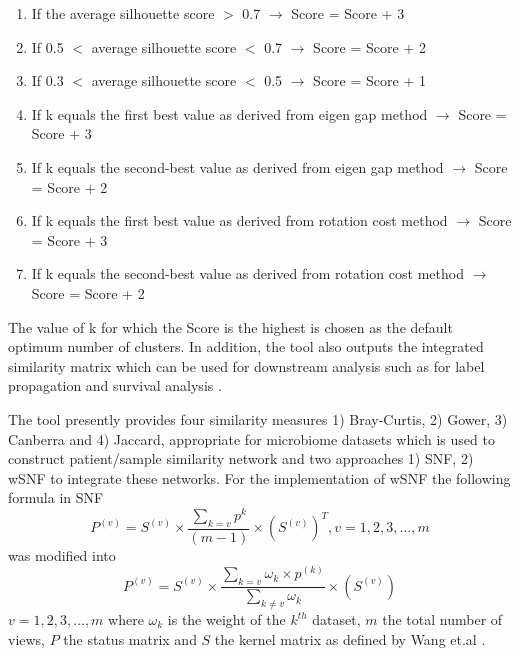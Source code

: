 \begin{enumerate}
	\item If the average silhouette score $>$ 0.7 $\rightarrow$ Score = Score + 3
	\item If 0.5 $<$ average silhouette score $<$ 0.7 $\rightarrow$ Score = Score + 2
	\item If 0.3 $<$ average silhouette score $<$ 0.5 $\rightarrow$ Score = Score + 1
	\item If k equals the first best value as derived from eigen gap method $\rightarrow$ Score = Score + 3
	\item If k equals the second-best value as derived from eigen gap method $\rightarrow$ Score = Score + 2
	\item If k equals the first best value as derived from rotation cost method $\rightarrow$ Score = Score + 3
	\item If k equals the second-best value as derived from rotation cost method $\rightarrow$ Score = Score + 2 
\end{enumerate} 
The value of k for which the Score is the highest is chosen as the default optimum number of clusters. In addition, the tool also outputs the integrated similarity matrix which can be used for downstream analysis such as for label propagation and survival analysis \cite{Wang2014}.

The tool presently provides four similarity measures 1) Bray-Curtis, 2) Gower, 3) Canberra and 4) Jaccard, appropriate for microbiome datasets which is used to construct patient/sample similarity network and two approaches 1) SNF, 2) wSNF to integrate these networks. For the implementation of wSNF the following formula in SNF
$$P^{(v)}=S^{(v)} \times \frac{\sum_{k=v} p^{k}}{(m-1)} \times (S^{(v)})^{T}, v=1,2,3, \ldots, m$$ was modified into $$P^{(v)}=S^{(v)} \times \frac{\sum_{k=v} \omega_{k} \times p^{(k)}}{\sum_{k \neq v} \omega_{k}} \times(S^{(v)})$$ $v=1,2,3, \ldots, m$
where $\omega_{k}$ is the weight of the $k^{ th}$ dataset, $m$ the total number of views, $P$ the status matrix and $S$ the kernel matrix as defined by Wang et.al \cite{Wang2014}.

